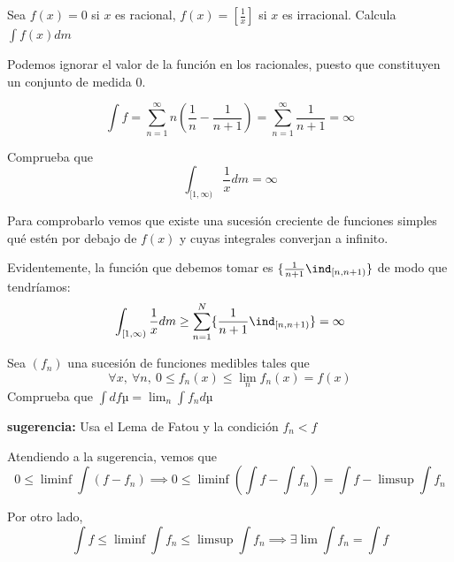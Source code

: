 \begin{problem}[3]
Sea $f(x) = 0$ si $x$ es racional, $f(x)=[\frac{1}{x}]$ si $x$ es irracional. Calcula $\int f(x)dm$

\solution

Podemos ignorar el valor de la función en los racionales, puesto que constituyen un conjunto de medida 0.


\[\int f = \sum_{n=1}^{\infty} n \left( \frac{1}{n}-\frac{1}{n+1}\right) = \sum_{n=1}^{\infty} \frac{1}{n+1} = \infty\]

\end{problem}

\begin{problem}[5]

Comprueba que
\[\int_{[1,\infty)} \frac{1}{x}dm = \infty\]

\solution

Para comprobarlo vemos que existe una sucesión creciente de funciones simples qué estén por debajo de $f(x)$ y cuyas integrales converjan a infinito.

Evidentemente, la función que debemos tomar es $\{\frac{1}{n+1}\ind_{[n,n+1)}\}$ de modo que tendríamos:
\[\int_{[1,\infty)} \frac{1}{x}dm \geq \sum_{n=1}^N \{\frac{1}{n+1}\ind_{[n,n+1)}\} = \infty\]

\end{problem}

\begin{problem}[6]

Sea $(f_n)$ una sucesión de funciones medibles tales que
\[\forall x, \ \forall n, \ 0 \leq f_n(x) \leq \lim_n f_n(x)=f(x)\]
Comprueba que
$\int dfµ = \lim_n \int f_n dµ$

\textbf{sugerencia:} Usa el Lema de Fatou y la condición $f_n < f$

\solution

Atendiendo a la sugerencia, vemos que
\[0 \leq \liminf \int (f-f_n) \implies 0 \leq \liminf(\int f - \int f_n) = \int f - \limsup \int f_n\]

Por otro lado,
\[\int f \leq \liminf \int f_n \leq \limsup \int f_n \implies \exists \lim \int f_n = \int f \]
\end{problem}


